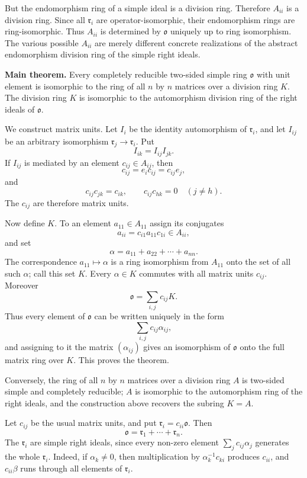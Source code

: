 \documentclass[11pt]{article}
\begin{document}
But the endomorphism ring of a simple ideal is a division ring.
Therefore \(A_{ii}\) is a division ring. Since all \(\mathfrak r_i\) are
operator-isomorphic, their endomorphism rings are ring-isomorphic. Thus
\(A_{ii}\) is determined by \(\mathfrak{o}\) uniquely up to ring
isomorphism. The various possible \(A_{ii}\) are merely different
concrete realizations of the abstract endomorphism division ring of the
simple right ideals.

\textbf{Main theorem.} Every completely reducible two-sided simple ring
\(\mathfrak{o}\) with unit element is isomorphic to the ring of all
\(n\) by \(n\) matrices over a division ring \(K\). The division ring
\(K\) is isomorphic to the automorphism division ring of the right
ideals of \(\mathfrak{o}\).

We construct matrix units. Let \(I_i\) be the identity automorphism of
\(\mathfrak r_i\), and let \(I_{ij}\) be an arbitrary isomorphism
\(\mathfrak r_j\to\mathfrak r_i\). Put \[
  I_{ik}=I_{ij}I_{jk}.
\] If \(I_{ij}\) is mediated by an element \(c_{ij}\in A_{ij}\), then \[
  c_{ij}=e_i c_{ij}=c_{ij}e_j,
\] and \[
  c_{ij}c_{jk}=c_{ik},
  \qquad
  c_{ij}c_{hk}=0\quad(j\ne h).
\] The \(c_{ij}\) are therefore matrix units.

Now define \(K\). To an element \(a_{11}\in A_{11}\) assign its
conjugates \[
  a_{ii}=c_{i1}a_{11}c_{1i}\in A_{ii},
\] and set \[
  \alpha=a_{11}+a_{22}+\cdots+a_{nn}.
\] The correspondence \(a_{11}\mapsto\alpha\) is a ring isomorphism from
\(A_{11}\) onto the set of all such \(\alpha\); call this set \(K\).
Every \(\alpha\in K\) commutes with all matrix units \(c_{ij}\).
Moreover \[
  \mathfrak{o}=\sum_{i,j} c_{ij}K.
\] Thus every element of \(\mathfrak{o}\) can be written uniquely in the
form \[
  \sum_{i,j} c_{ij}\alpha_{ij},
\] and assigning to it the matrix \((\alpha_{ij})\) gives an isomorphism
of \(\mathfrak{o}\) onto the full matrix ring over \(K\). This proves
the theorem.

Conversely, the ring of all \(n\) by \(n\) matrices over a division ring
\(A\) is two-sided simple and completely reducible; \(A\) is isomorphic
to the automorphism ring of the right ideals, and the construction above
recovers the subring \(K=A\).

Let \(c_{ij}\) be the usual matrix units, and put
\(\mathfrak r_i=c_{ii}\mathfrak{o}\). Then \[
  \mathfrak{o}=\mathfrak r_1+\cdots+\mathfrak r_n.
\] The \(\mathfrak r_i\) are simple right ideals, since every non-zero
element \(\sum_j c_{ij}\alpha_j\) generates the whole \(\mathfrak r_i\).
Indeed, if \(\alpha_k\ne0\), then multiplication by
\(\alpha_k^{-1}c_{ki}\) produces \(c_{ii}\), and \(c_{ii}\beta\) runs
through all elements of \(\mathfrak r_i\).
\end{document}
